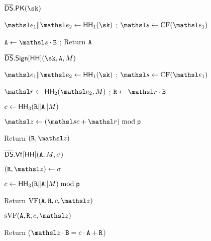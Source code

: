 \begin{figure}[t]
{\begin{algorithm-subsequent}{$\fDS.\MakePK(\sk)$}
  \item  $\eEDSA_1\|\eEDSA_2 \gets \HH_1(\sk)$
		; $\s \gets \Clamp(\eEDSA_1)$
		\item $\curvepoint{A} \gets \s\cdot \generatorEDSA$
  ; Return $\mathtt{A}$
\end{algorithm-subsequent}		


	\ExptSepSpace
	\begin{algorithm-subsequent}{$\fDS.\Sign[\HH](\sk,\curvepoint{A},\msg)$}
		\item $\eEDSA_1\|\eEDSA_2 \gets \HH_1(\sk)$
		; $\s \gets \Clamp(\eEDSA_1)$ 
		\item $\littler \gets \HH_2(\eEDSA_2,\msg)$
		; $\curvepoint{R} \gets \littler \cdot \generatorEDSA$
		\item $c \gets \mathsf{HH}_3(\mathtt{R}\|\mathtt{A}\|{M})$
		\item $\z \gets (\s c + \littler) \bmod \Prime$
		\item Return $(\curvepoint{R},\z)$
	\end{algorithm-subsequent}
	\ExptSepSpace
	\begin{algorithm-subsequent}{$\overline{\mathsf{DS}}.\mathsf{Vf}[\mathsf{HH}](\mathtt{A}, {M}, \sigma)$}
		\item $(\curvepoint{R}, \z) \gets \sigma$
		\item $c \gets \mathsf{HH}_3(\mathtt{R}\|\mathtt{A}\|{M}) \bmod \mathsf{p}$
		\item Return $\VF(\curvepoint{A},\curvepoint{R},c,\z)$
	\end{algorithm-subsequent}  \vspace{2pt}
 }
	{
		\begin{algorithm-initial}{$\sVF(\curvepoint{A}, \curvepoint{R}, c, \z)$}
			\item Return ($\z \cdot \generatorEDSA = c \cdot \curvepoint{A} + \curvepoint{R}$)
		\end{algorithm-initial} \vspace{10pt}
	
}
\end{figure}
